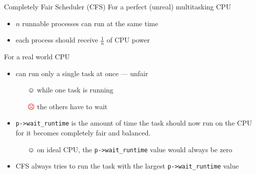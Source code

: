 
\begin{frame}{Completely Fair Scheduler (CFS)}
  For a perfect (unreal) multitasking CPU
  \begin{itemize}
  \item $n$ runnable processes can run at the same time
  \item each process should receive $\frac{1}{n}$ of CPU power
  \end{itemize}
  
  For a real world CPU
  \begin{itemize}
  \item can run only a single task at once --- unfair
    \begin{itemize}
    \item[☺] while one task is running
    \item[\textcolor{red}{☹}] the others have to wait
    \end{itemize}
  \item \texttt{p->wait\_runtime} is the amount of time the task should now run on the CPU
    for it becomes completely fair and balanced.
    \begin{itemize}
    \item[☺] on ideal CPU, the \texttt{p->wait\_runtime} value would always be zero
    \end{itemize}
  \item CFS always tries to run the task with the largest \texttt{p->wait\_runtime} value
  \end{itemize}
\end{frame}

